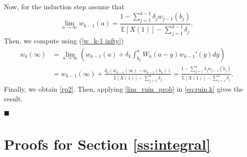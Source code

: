 \documentclass[12pt,reqno]{amsart}
\theoremstyle{definition}
\theoremstyle{remark}
\begin{document}
Now, for the induction step assume that 
\begin{equation}\label{w_k-1 infty}
\lim_{a\to \infty} w_{k-1}(a)= \frac{1-\sum_{j=1}^{k-1} \delta_j w_{j-1}(b_j)}{\mathbb{E}[X(1)]-\sum_{j=1}^{k-1}\delta_j} .\end{equation}
Then, we compute using (\ref{w_k-1 infty})
\begin{align*}
w_k(\infty)&=\lim_{a\to \infty}\left(w_{k-1}(a)+ \delta_k \int_{b_k}^{a} W_k(a-y) w_{k-1}'(y) dy \right)\\ &= w_{k-1}(\infty)+\frac{\delta_k \left( w_{k-1}(\infty)-  w_{k-1}(b_k) \right) }{\mathbb{E}[X(1)]-\sum_{j=1}^{k}\delta_j}
= \frac{1-\sum_{j=1}^{k} \delta_j w_{j-1}(b_j)}{\mathbb{E}[X(1)]-\sum_{j=1}^k\delta_j}.
\end{align*}
Finally, we obtain \eqref{rp2}. Then, applying \eqref{lim_ruin_prob} in \eqref{eq:ruin.k} gives the result.
\begin{flushright}$\blacksquare$\end{flushright}


\section{Proofs for  Section \ref{ss:integral}}\label{AppD}
\end{document}
